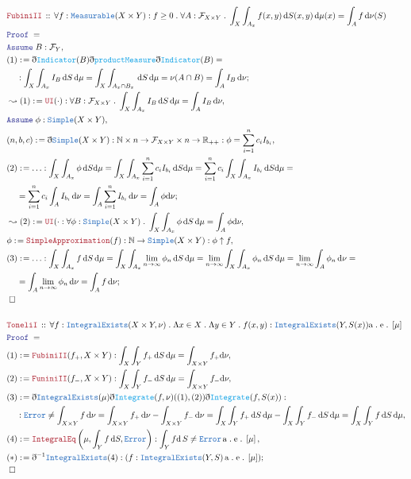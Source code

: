 \documentclass[12pt]{scrartcl}
\newcommand{\TYPE}[1]{\textcolor{NavyBlue}{\mathtt{#1}}}
\newcommand{\FUNC}[1]{\textcolor{Cerulean}{\mathtt{#1}}}
\newcommand{\LOGIC}[1]{\textcolor{Blue}{\mathtt{#1}}}
\newcommand{\THM}[1]{\textcolor{Maroon}{\mathtt{#1}}}
\renewcommand{\.}{\; . \;}
\newcommand{\de}{: \kern 0.1pc =}
\newcommand{\Theorem}[2]{& \THM{#1} \, :: \, #2 \\ & \Proof = \\ }
\newcommand{\NewLine}{\\ & \kern 1pc}
\newcommand{\ForEach}[3]{\forall #1 : #2 \. #3 }
\newcommand{\Reals}{\mathbb{R} }
\newcommand{\Nat}{\mathbb{N} }
\newcommand{\Say}[3]{& #1 \de #2 : #3, \\}
\newcommand{\Conclude}[3]{& #1 \de #2 : #3; \\}
\newcommand{\Derive}[3]{& \leadsto #1 \de #2 : #3, \\}
\newcommand{\A}{\LOGIC{Assume} \;}
\newcommand{\Assume}[2]{& \A #1 : #2, \\}
\newcommand{\QED}{\; \square}
\newcommand{\EndProof}{& \QED \\}
\newcommand{\ByDef}{\eth}
\newcommand{\Proof}{\LOGIC{Proof} \; }
\renewcommand{\AE}[1]{\mathrm{a\. e\.} \left[#1\right]}
\newcommand{\F}{\mathcal{F}}
\begin{document}
\begin{align*}
\Theorem{FubiniII}{
\ForEach{f}{\TYPE{Measurable}(X \times Y) : f \ge 0  }{
\ForEach{A}{\F_{X \times Y }}{\int_X \int_{A_x} f(x,y) \, \mathrm{d} S(x,y) \, \mathrm{d} \mu(x) = \int_A f \, \mathrm{d} \nu(S)}}}
\Assume{B}{\F_Y}
\Conclude{(1)}{\ByDef\FUNC{Indicator}(B)\ByDef\FUNC{productMeasure}\ByDef\FUNC{Indicator}(B) = \NewLine}
{ \int_X \int_{A_x} I_B \, \mathrm{d} S \, \mathrm{d} \mu = \int_X \int_{A_x \cap B_x} \, \mathrm{d}S \, \mathrm{d}\mu = \nu(A \cap B) = \int_A I_B \, \mathrm{d} \nu }
\Derive{(1)}{\THM{UI}(\cdot)}{ \ForEach{B}{\F_{X \times Y}}{ \int_X \int_{A_x} I_B \, \mathrm{d} S  \, \mathrm{d}\mu = \int_{A} I_B  \, \mathrm{d} \nu  }}
\Assume{\phi}{\TYPE{Simple}(X \times Y)}
\Say{(n,b,c)}{\ByDef \TYPE{Simple}(X \times Y)}{ \Nat \times n \to \F_{X \times Y} \times n \to \Reals_{++} : \phi = \sum^n_{i=1}c_iI_{b_i} }
\Conclude{(2)}{\ldots}{ \int_X \int_{A_x} \phi \, \mathrm{d} S \mathrm{d} \mu 
= \int_{X} \int_{A_x} \sum^n_{i=1}c_i I_{b_i} \, \mathrm{d} S \mathrm{d} \mu
=  \sum^n_{i = 1} c_i \int_X \int_{A_x}  I_{b_i} \, \mathrm{d} S \mathrm{d} \mu = \NewLine
=  \sum^n_{i = 1} c_i \int_A I_{b_i} \, \mathrm{ d } \nu
= \int_A \sum^n_{i = 1} I_{b_i} \, \mathrm{ d } \nu
= \int_A \phi \mathrm{ d } \nu
 }
\Derive{(2)}{\THM{UI}(\cdot}{ \ForEach{\phi}{\TYPE{Simple}(X \times Y)}{ \int_X \int_{A_x} \phi \, \mathrm{d} S \, \mathrm{d} \mu = \int_A \phi \mathrm{ d } \nu } }
\Say{\phi}{\THM{SimpleApproximation}(f)}{ \Nat \to \TYPE{Simple}(X \times Y) : \phi \uparrow f }
\Conclude{ (3)}{\ldots}{
\int_X \int_{A_x} f \,  \mathrm{d} S \, \mathrm{d} \mu  
= \int_X \int_{A_x} \lim_{n \to \infty} \phi_n \, \mathrm{d} S \, \mathrm{d} \mu
= \lim_{n \to \infty} \int_X \int_{A_x} \phi_n \, \mathrm{d} S \, \mathrm{d} \mu
= \lim_{n \to \infty} \int_A \phi_n \, \mathrm{d} \nu = \NewLine
= \int_{A} \lim_{n \to \infty} \phi_n \, \mathrm{d} \nu
= \int_{A} f \, \mathrm{d} \nu
}
\EndProof
\\
\Theorem{ToneliI}{
\ForEach{f}{\TYPE{IntegralExists}(X \times Y, \nu)}{
 \Lambda x \in X \.  \Lambda y \in Y \. f(x,y) : \TYPE{IntegralExists}(Y,S(x)) \AE{\mu}
}}
\Say{(1)}{ \THM{FubiniII}(f_+,X \times Y) }
{ \int_X \int_Y f_+ \, \mathrm{d} S \, \mathrm{d}\mu 
 = \int_{X \times Y} f_+ \mathrm{d}{\nu}  
 }
\Say{(2)}{ \THM{FuniniII}(f_-,X \times Y)}
{
 \int_X \int_Y f_- \, \mathrm{d} S \, \mathrm{d} \mu
 = \int_{X \times Y} f_- \mathrm{d}{\nu}
}
\Say{(3)}{ \ByDef\TYPE{IntegralExists}(\mu)\ByDef\FUNC{Integrate}(f,\nu)((1),(2))\ByDef\FUNC{Integrate}(f,S(x))  : \NewLine }
{ \TYPE{Error} \neq \int_{X \times Y} f  \,\mathrm{d} \nu  
 = \int_{X \times Y} f_+ \, \mathrm{d} \nu
  - \int_{X \times Y} f_- \, \mathrm{d} \nu =
 \int_X \int_Y f_+ \, \mathrm{d} S \, \mathrm{d} \mu
 - \int_X \int_Y f_- \, \mathrm{d} S \, \mathrm{d} \mu =
\int_X \int_Y f \, \mathrm{d} S \, \mathrm{d} \mu
}
\Say{(4)}{\THM{IntegralEq}\left( \mu  , \int_Y f \, \mathrm{d} S, \TYPE{Error} \right)}
{ \int_Y f \mathrm{d} \, S  \neq \TYPE{Error}  \, \AE{\mu} }
\Conclude{(*)}{\ByDef^{-1} \TYPE{IntegralExists}(4)}{ ( f : \TYPE{IntegralExists}(Y,S) \, \AE{\mu} ) }
\EndProof
\end{align*}
\end{document}
